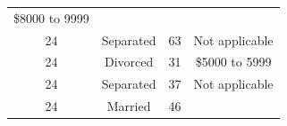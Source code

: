 \documentclass[]{tufte-book}
\begin{document}
\begin{longtable}[]{@{}cccc@{}}
\begin{minipage}[t]{0.21\columnwidth}
\$8000 to 9999\strut
\end{minipage}\tabularnewline
\begin{minipage}[t]{0.14\columnwidth}\centering\strut
24\strut
\end{minipage} & \begin{minipage}[t]{0.20\columnwidth}\centering\strut
Separated\strut
\end{minipage} & \begin{minipage}[t]{0.07\columnwidth}\centering\strut
63\strut
\end{minipage} & \begin{minipage}[t]{0.21\columnwidth}\centering\strut
Not applicable\strut
\end{minipage}\tabularnewline
\begin{minipage}[t]{0.14\columnwidth}\centering\strut
24\strut
\end{minipage} & \begin{minipage}[t]{0.20\columnwidth}\centering\strut
Divorced\strut
\end{minipage} & \begin{minipage}[t]{0.07\columnwidth}\centering\strut
31\strut
\end{minipage} & \begin{minipage}[t]{0.21\columnwidth}\centering\strut
\$5000 to 5999\strut
\end{minipage}\tabularnewline
\begin{minipage}[t]{0.14\columnwidth}\centering\strut
24\strut
\end{minipage} & \begin{minipage}[t]{0.20\columnwidth}\centering\strut
Separated\strut
\end{minipage} & \begin{minipage}[t]{0.07\columnwidth}\centering\strut
37\strut
\end{minipage} & \begin{minipage}[t]{0.21\columnwidth}\centering\strut
Not applicable\strut
\end{minipage}\tabularnewline
\begin{minipage}[t]{0.14\columnwidth}\centering\strut
24\strut
\end{minipage} & \begin{minipage}[t]{0.20\columnwidth}\centering\strut
Married\strut
\end{minipage} & \begin{minipage}[t]{0.07\columnwidth}\centering\strut
46\strut
\end{minipage} & \begin{minipage}[t]{0.21\columnwidth}\centering\strut

\end{minipage}
\end{longtable}
\end{document}
